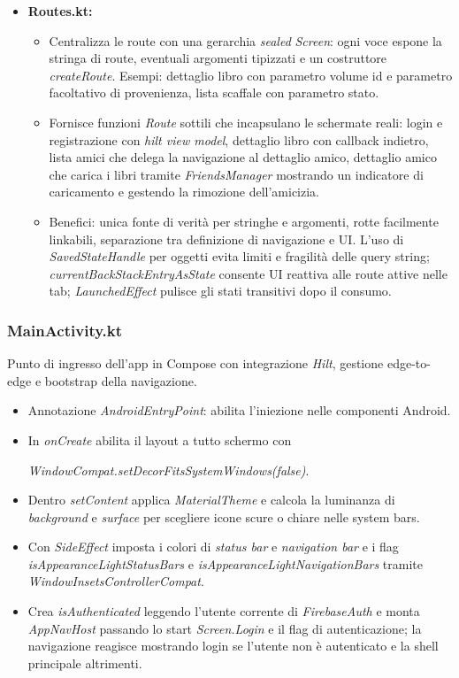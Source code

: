 \documentclass{article}
\begin{document}
\begin{itemize}
\item \textbf{Routes.kt:}
  \begin{itemize}
    \item Centralizza le route con una gerarchia \textit{sealed} \textit{Screen}: ogni voce espone la stringa di route, eventuali argomenti tipizzati e un costruttore \textit{createRoute}. Esempi: dettaglio libro con parametro volume id e parametro facoltativo di provenienza, lista scaffale con parametro stato.
    \item Fornisce funzioni \textit{Route} sottili che incapsulano le schermate reali: login e registrazione con \textit{hilt view model}, dettaglio libro con callback indietro, lista amici che delega la navigazione al dettaglio amico, dettaglio amico che carica i libri tramite \textit{FriendsManager} mostrando un indicatore di caricamento e gestendo la rimozione dell’amicizia.
    \item Benefici: unica fonte di verità per stringhe e argomenti, rotte facilmente linkabili, separazione tra definizione di navigazione e UI. L’uso di \textit{SavedStateHandle} per oggetti evita limiti e fragilità delle query string; \textit{currentBackStackEntryAsState} consente UI reattiva alle route attive nelle tab; \textit{LaunchedEffect} pulisce gli stati transitivi dopo il consumo.
    \end{itemize}
\end{itemize}

\subsubsection{MainActivity.kt}
Punto di ingresso dell’app in Compose con integrazione \textit{Hilt}, gestione edge-to-edge e bootstrap della navigazione.
\begin{itemize}
\item Annotazione \textit{AndroidEntryPoint}: abilita l’iniezione nelle componenti Android.
\item In \textit{onCreate} abilita il layout a tutto schermo con 

\textit{WindowCompat.setDecorFitsSystemWindows(false)}.
\item Dentro \textit{setContent} applica \textit{MaterialTheme} e calcola la luminanza di \textit{background} e \textit{surface} per scegliere icone scure o chiare nelle system bars.
\item Con \textit{SideEffect} imposta i colori di \textit{status bar} e \textit{navigation bar} e i flag \textit{isAppearanceLightStatusBars} e \textit{isAppearanceLightNavigationBars} tramite \textit{WindowInsetsControllerCompat}.
\item Crea \textit{isAuthenticated} leggendo l’utente corrente di \textit{FirebaseAuth} e monta \textit{AppNavHost} passando lo start \textit{Screen.Login} e il flag di autenticazione; la navigazione reagisce mostrando login se l’utente non è autenticato e la shell principale altrimenti.
\end{itemize}
\end{document}

